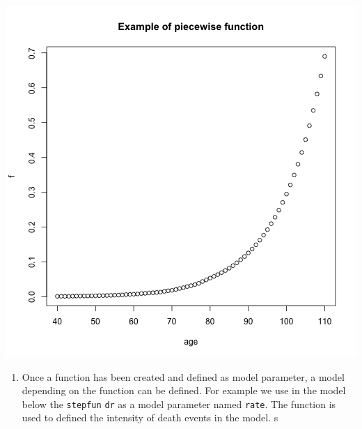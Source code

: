 \begin{center}\includegraphics{plot_piecewise-1} \end{center}

\begin{enumerate}
\def\labelenumi{\arabic{enumi}.}
\setcounter{enumi}{1}
\tightlist
\item
  Once a function has been created and defined as model parameter, a model depending on the function can be defined. For example we use in the model below the \texttt{stepfun} \texttt{dr} as a model parameter named \texttt{rate}. The function is used to defined the intensity of death events in the model.
  s
\end{enumerate}

